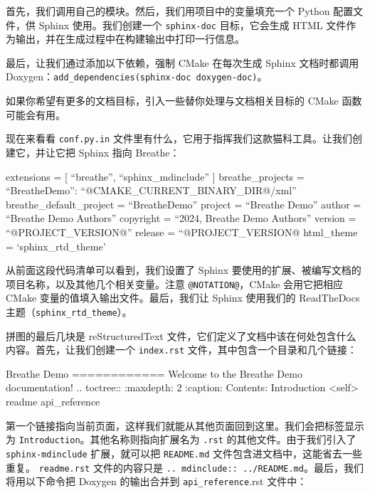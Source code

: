 首先，我们调用自己的模块。然后，我们用项目中的变量填充一个 Python 配置文件，供 Sphinx 使用。我们创建一个 \texttt{sphinx-doc} 目标，它会生成 HTML 文件作为输出，并在生成过程中在构建输出中打印一行信息。

最后，让我们通过添加以下依赖，强制 CMake 在每次生成 Sphinx 文档时都调用 Doxygen：\texttt{add\_\allowbreak{}dependencies(\allowbreak{}sphinx-doc doxygen-doc)\allowbreak{}}。

如果你希望有更多的文档目标，引入一些替你处理与文档相关目标的 CMake 函数可能会有用。

现在来看看 \texttt{conf.\allowbreak{}py.\allowbreak{}in} 文件里有什么，它用于指挥我们这款猫科工具。让我们创建它，并让它把 Sphinx 指向 Breathe：

\begin{codebox}[python]
extensions = [ “breathe”, “sphinx_mdinclude” ]
breathe_projects = { “BreatheDemo”: “@CMAKE_CURRENT_BINARY_DIR@/xml” }
breathe_default_project = “BreatheDemo”
project = “Breathe Demo”
author = “Breathe Demo Authors”
copyright = “2024, Breathe Demo Authors”
version = “@PROJECT_VERSION@”
release = “@PROJECT_VERSION@
html_theme = ‘sphinx_rtd_theme’
\end{codebox}

\label{idx:258}
从前面这段代码清单可以看到，我们设置了 Sphinx 要使用的扩展、被编写文档的项目名称，以及其他几个相关变量。注意 \texttt{@NOTATION@}，CMake 会用它把相应 CMake 变量的值填入输出文件。最后，我们让 Sphinx 使用我们的 ReadTheDocs 主题（\texttt{sphinx\_\allowbreak{}rtd\_\allowbreak{}theme}）。

拼图的最后几块是 reStructuredText 文件，它们定义了文档中该在何处包含什么内容。首先，让我们创建一个 \texttt{index.rst} 文件，其中包含一个目录和几个链接：

\begin{codebox}[text]
Breathe Demo
============
Welcome to the Breathe Demo documentation!
.. toctree::
 :maxdepth: 2
 :caption: Contents:
Introduction <self>
 readme
 api_reference
\end{codebox}

第一个链接指向当前页面，这样我们就能从其他页面回到这里。我们会把标签显示为 \texttt{Introduction}。其他名称则指向扩展名为 \texttt{.rst} 的其他文件。由于我们引入了 \texttt{sphinx-mdinclude} 扩展，就可以把 \texttt{README.md} 文件包含进文档中，这能省去一些重复。 \texttt{readme.\allowbreak{}rst} 文件的内容只是 \texttt{.\allowbreak{}.\allowbreak{} mdinclude::\allowbreak{} .\allowbreak{}.\allowbreak{}/\allowbreak{}README.\allowbreak{}md}。最后，我们将用以下命令把 Doxygen 的输出合并到 \texttt{api\_\allowbreak{}reference}.rst 文件中：

